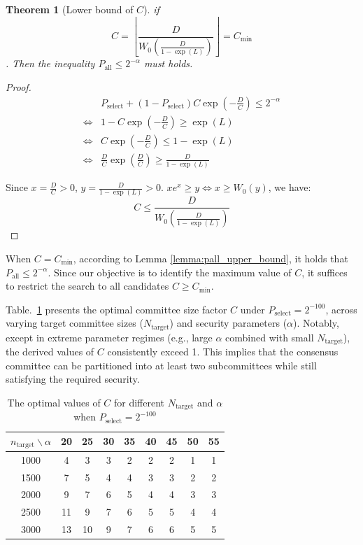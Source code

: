 \documentclass[journal]{IEEEtran}
\newtheorem{theorem}{Theorem}
\begin{document}
\begin{theorem}[Lower bound of $C$]
\label{thm:lower-bound-c}
if $$C= \left\lfloor\frac{D}{W_0(\frac{D}{1-\exp(L)})} \right\rfloor=C_{\min}$$. 
Then the inequality $P_{\text{all}} \le 2^{-\alpha}$ must holds.
\end{theorem}
\begin{proof}
\begin{align}
&P_{\text{select}} + (1 - P_{\text{select}})  C  \exp\left(- \tfrac{D}{C} \right) \le 2^{-\alpha}\nonumber \\
\iff &1-C  \exp\left(- \frac{D}{C} \right) \ge \exp(L)\nonumber\\
\iff &C  \exp\left(- \frac{D}{C} \right) \le 1-\exp(L) \nonumber\\
\iff &\frac{D}{C}  \exp\left( \frac{D}{C} \right) \ge \frac{D}{1-\exp(L)}
\end{align}

Since $x=\frac{D}{C}>0$, $y=\frac{D}{1-\exp(L)}>0$. $xe^x \ge y \iff x\ge W_0(y)$, we have:
\begin{equation}
    C \le \frac{D}{W_0(\frac{D}{1-\exp(L)})}
\end{equation}
\end{proof}

When $C = C_{\min}$, according to Lemma \ref{lemma:pall_upper_bound}, it holds that $P_{\text{all}} \leq 2^{-\alpha}$. Since our objective is to identify the maximum value of $C$, it suffices to restrict the search to all candidates $C \geq C_{\min}$.

Table.~\ref{table:n_target_vs_alpha_c} presents the optimal committee size factor $C$ under $ P_{\text{select}} = 2^{-100} $, across varying target committee sizes ($ N_{\text{target}} $) and security parameters ($ \alpha $). Notably, except in extreme parameter regimes (e.g., large $ \alpha $ combined with small $ N_{\text{target}} $), the derived values of $ C $ consistently exceed 1. This implies that the consensus committee can be partitioned into at least two subcommittees while still satisfying the required security.
\begin{table}[ht]
\label{table:n_target_vs_alpha_c}
\begin{tabular}{c|cccccccc}
\hline
$n_{\text{target}} \backslash \alpha$ & 20 & 25 & 30 & 35 & 40 & 45 & 50 & 55 \\
\hline
1000 & 4 & 3 & 3 & 2 & 2 & 2 & 1 & 1 \\
1500 & 7 & 5 & 4 & 4 & 3 & 3 & 2 & 2 \\
2000 & 9 & 7 & 6 & 5 & 4 & 4 & 3 & 3 \\
2500 & 11 & 9 & 7 & 6 & 5 & 5 & 4 & 4 \\
3000 & 13 & 10 & 9 & 7 & 6 & 6 & 5 & 5 \\
\hline
\end{tabular}
\vspace{3pt}
\caption{The optimal values of $C$ for different $N_{\text{target}}$ and $\alpha$ when $P_{\text{select}}=2^{-100}$}
\end{table}
\end{document}

